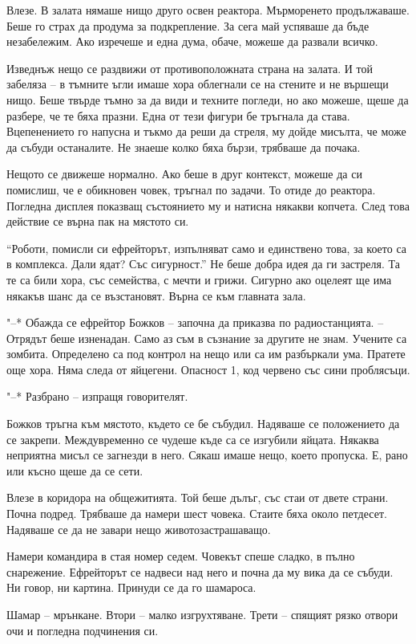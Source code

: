 \documentclass[ebook,openany,12pt]{memoir}
\begin{document}
Влезе. В залата нямаше нищо друго освен реактора. Мърморенето продължаваше. Беше го страх да продума за подкрепление. За сега май успяваше да бъде незабележим. Ако изречеше и една дума, обаче, можеше да развали всичко.

Изведнъж нещо се раздвижи от противоположната страна на залата. И той забеляза – в тъмните ъгли имаше хора облегнали се на стените и не вършещи нищо. Беше твърде тъмно за да види и техните погледи, но ако можеше, щеше да разбере, че те бяха празни. Една от тези фигури бе тръгнала да става. Вцепенението го напусна и тъкмо да реши да стреля, му дойде мисълта, че може да събуди останалите. Не знаеше колко бяха бързи, трябваше да почака. 

Нещото се движеше нормално. Ако беше в друг контекст, можеше да си помислиш, че е обикновен човек, тръгнал по задачи. То отиде до реактора. Погледна дисплея показващ състоянието му и натисна някакви копчета. След това действие се върна пак на мястото си.

``Роботи, помисли си ефрейторът, изпълняват само и единствено това, за което са в комплекса. Дали ядат? Със сигурност.'' Не беше добра идея да ги застреля. Та те са били хора, със семейства, с мечти и грижи. Сигурно ако оцелеят ще има някакъв шанс да се възстановят. Върна се към главната зала.

"--* Обажда се ефрейтор Божков – започна да приказва по радиостанцията. – Отрядът беше изненадан. Само аз съм в съзнание за другите не знам. Учените са зомбита. Определено са под контрол на нещо или са им разбъркали ума. Пратете още хора. Няма следа от яйцегени. Опасност 1, код червено със сини проблясъци.

"--* Разбрано – изпращя говорителят.

Божков тръгна към мястото, където се бе събудил. Надяваше се положението да се закрепи. Междувременно се чудеше къде са се изгубили яйцата. Някаква неприятна мисъл се загнезди в него. Сякаш имаше нещо, което пропуска. Е, рано или късно щеше да се сети.

Влезе в коридора на общежитията. Той беше дълъг, със стаи от двете страни. Почна подред. Трябваше да намери шест човека. Стаите бяха около петдесет. Надяваше се да не завари нещо животозастрашаващо. 

Намери командира в стая номер седем. Човекът спеше сладко, в пълно снарежение. Ефрейторът се надвеси над него и почна да му вика да се събуди. Ни говор, ни картина. Принуди се да го шамароса.

Шамар – мрънкане. Втори – малко изгрухтяване. Трети – спящият рязко отвори очи и погледна подчинения си. 
\end{document}
